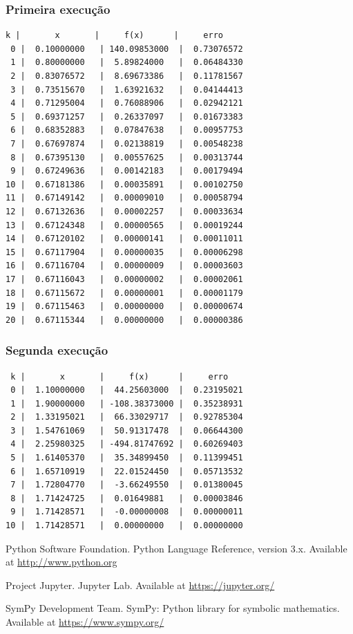 \documentclass{article}
\begin{document}
\subsubsection{Primeira execução}
\begin{verbatim}
k |       x       |     f(x)      |     erro      
 0 |  0.10000000   | 140.09853000  |  0.73076572   
 1 |  0.80000000   |  5.89824000   |  0.06484330   
 2 |  0.83076572   |  8.69673386   |  0.11781567   
 3 |  0.73515670   |  1.63921632   |  0.04144413   
 4 |  0.71295004   |  0.76088906   |  0.02942121   
 5 |  0.69371257   |  0.26337097   |  0.01673383   
 6 |  0.68352883   |  0.07847638   |  0.00957753   
 7 |  0.67697874   |  0.02138819   |  0.00548238   
 8 |  0.67395130   |  0.00557625   |  0.00313744   
 9 |  0.67249636   |  0.00142183   |  0.00179494   
10 |  0.67181386   |  0.00035891   |  0.00102750   
11 |  0.67149142   |  0.00009010   |  0.00058794   
12 |  0.67132636   |  0.00002257   |  0.00033634   
13 |  0.67124348   |  0.00000565   |  0.00019244   
14 |  0.67120102   |  0.00000141   |  0.00011011   
15 |  0.67117904   |  0.00000035   |  0.00006298   
16 |  0.67116704   |  0.00000009   |  0.00003603   
17 |  0.67116043   |  0.00000002   |  0.00002061   
18 |  0.67115672   |  0.00000001   |  0.00001179   
19 |  0.67115463   |  0.00000000   |  0.00000674   
20 |  0.67115344   |  0.00000000   |  0.00000386   
\end{verbatim}

\subsubsection{Segunda execução}
\begin{verbatim}
 k |       x       |     f(x)      |     erro      
 0 |  1.10000000   |  44.25603000  |  0.23195021   
 1 |  1.90000000   | -108.38373000 |  0.35238931   
 2 |  1.33195021   |  66.33029717  |  0.92785304   
 3 |  1.54761069   |  50.91317478  |  0.06644300   
 4 |  2.25980325   | -494.81747692 |  0.60269403   
 5 |  1.61405370   |  35.34899450  |  0.11399451   
 6 |  1.65710919   |  22.01524450  |  0.05713532   
 7 |  1.72804770   |  -3.66249550  |  0.01380045   
 8 |  1.71424725   |  0.01649881   |  0.00003846   
 9 |  1.71428571   |  -0.00000008  |  0.00000011   
10 |  1.71428571   |  0.00000000   |  0.00000000   
\end{verbatim}


\begin{thebibliography}{9}
 Python Software Foundation. Python Language Reference, version 3.x. Available at \url{http://www.python.org}

 Project Jupyter. Jupyter Lab. Available at \url{https://jupyter.org/}

 SymPy Development Team. SymPy: Python library for symbolic mathematics. Available at \url{https://www.sympy.org/}
\end{thebibliography}
\end{document}
